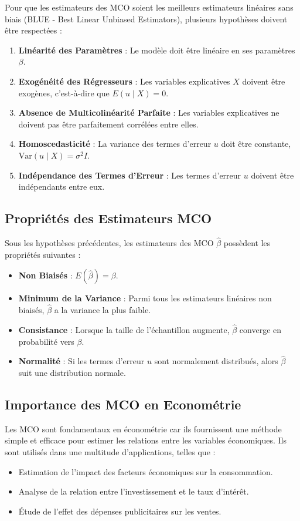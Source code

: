 \documentclass[14pt]{extarticle} %
\begin{document}
Pour que les estimateurs des MCO soient les meilleurs estimateurs linéaires sans biais (BLUE - Best Linear Unbiased Estimators), plusieurs hypothèses doivent être respectées :
\begin{enumerate}
    \item \textbf{Linéarité des Paramètres} : Le modèle doit être linéaire en ses paramètres \(\beta\).
    \item \textbf{Exogénéité des Régresseurs} : Les variables explicatives \(X\) doivent être exogènes, c'est-à-dire que \(E(u \mid X) = 0\).
    \item \textbf{Absence de Multicolinéarité Parfaite} : Les variables explicatives ne doivent pas être parfaitement corrélées entre elles.
    \item \textbf{Homoscedasticité} : La variance des termes d'erreur \(u\) doit être constante, \(\text{Var}(u \mid X) = \sigma^2 I\).
    \item \textbf{Indépendance des Termes d'Erreur} : Les termes d'erreur \(u\) doivent être indépendants entre eux.
\end{enumerate}

\subsection{Propriétés des Estimateurs MCO}

Sous les hypothèses précédentes, les estimateurs des MCO \(\hat{\beta}\) possèdent les propriétés suivantes :
\begin{itemize}
    \item \textbf{Non Biaisés} : \(E(\hat{\beta}) = \beta\).
    \item \textbf{Minimum de la Variance} : Parmi tous les estimateurs linéaires non biaisés, \(\hat{\beta}\) a la variance la plus faible.
    \item \textbf{Consistance} : Lorsque la taille de l'échantillon augmente, \(\hat{\beta}\) converge en probabilité vers \(\beta\).
    \item \textbf{Normalité} : Si les termes d'erreur \(u\) sont normalement distribués, alors \(\hat{\beta}\) suit une distribution normale.
\end{itemize}

\subsection{Importance des MCO en Econométrie}

Les MCO sont fondamentaux en économétrie car ils fournissent une méthode simple et efficace pour estimer les relations entre les variables économiques. Ils sont utilisés dans une multitude d'applications, telles que :
\begin{itemize}
    \item Estimation de l'impact des facteurs économiques sur la consommation.
    \item Analyse de la relation entre l'investissement et le taux d'intérêt.
    \item Étude de l'effet des dépenses publicitaires sur les ventes.
\end{itemize}
\end{document}
